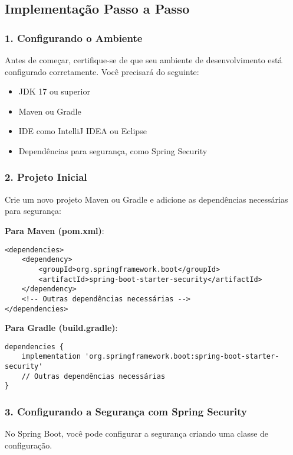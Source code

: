 \documentclass[a4paper,12pt]{book}
\begin{document}
\subsection{Implementação Passo a Passo}

\subsubsection{1. Configurando o Ambiente}
Antes de começar, certifique-se de que seu ambiente de desenvolvimento está configurado corretamente. Você precisará do seguinte:
\begin{itemize}
    \item JDK 17 ou superior
    \item Maven ou Gradle
    \item IDE como IntelliJ IDEA ou Eclipse
    \item Dependências para segurança, como Spring Security
\end{itemize}

\subsubsection{2. Projeto Inicial}
Crie um novo projeto Maven ou Gradle e adicione as dependências necessárias para segurança:

\textbf{Para Maven (pom.xml)}:
\begin{verbatim}
<dependencies>
    <dependency>
        <groupId>org.springframework.boot</groupId>
        <artifactId>spring-boot-starter-security</artifactId>
    </dependency>
    <!-- Outras dependências necessárias -->
</dependencies>
\end{verbatim}
\textbf{Para Gradle (build.gradle)}:
\begin{verbatim}
dependencies {
    implementation 'org.springframework.boot:spring-boot-starter-security'
    // Outras dependências necessárias
}
\end{verbatim}

\subsubsection{3. Configurando a Segurança com Spring Security}
No Spring Boot, você pode configurar a segurança criando uma classe de configuração.
\end{document}
